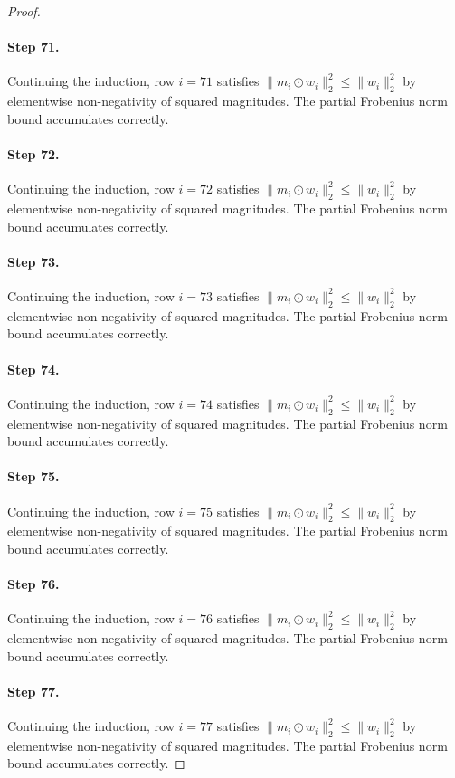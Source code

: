 \begin{proof}
\paragraph{Step 71.}
Continuing the induction, row $i=71$
satisfies $\|m_i \odot w_i\|_2^2 \leq \|w_i\|_2^2$ by elementwise non-negativity
of squared magnitudes.  The partial Frobenius norm bound accumulates correctly.

\paragraph{Step 72.}
Continuing the induction, row $i=72$
satisfies $\|m_i \odot w_i\|_2^2 \leq \|w_i\|_2^2$ by elementwise non-negativity
of squared magnitudes.  The partial Frobenius norm bound accumulates correctly.

\paragraph{Step 73.}
Continuing the induction, row $i=73$
satisfies $\|m_i \odot w_i\|_2^2 \leq \|w_i\|_2^2$ by elementwise non-negativity
of squared magnitudes.  The partial Frobenius norm bound accumulates correctly.

\paragraph{Step 74.}
Continuing the induction, row $i=74$
satisfies $\|m_i \odot w_i\|_2^2 \leq \|w_i\|_2^2$ by elementwise non-negativity
of squared magnitudes.  The partial Frobenius norm bound accumulates correctly.

\paragraph{Step 75.}
Continuing the induction, row $i=75$
satisfies $\|m_i \odot w_i\|_2^2 \leq \|w_i\|_2^2$ by elementwise non-negativity
of squared magnitudes.  The partial Frobenius norm bound accumulates correctly.

\paragraph{Step 76.}
Continuing the induction, row $i=76$
satisfies $\|m_i \odot w_i\|_2^2 \leq \|w_i\|_2^2$ by elementwise non-negativity
of squared magnitudes.  The partial Frobenius norm bound accumulates correctly.

\paragraph{Step 77.}
Continuing the induction, row $i=77$
satisfies $\|m_i \odot w_i\|_2^2 \leq \|w_i\|_2^2$ by elementwise non-negativity
of squared magnitudes.  The partial Frobenius norm bound accumulates correctly.


\end{proof}

